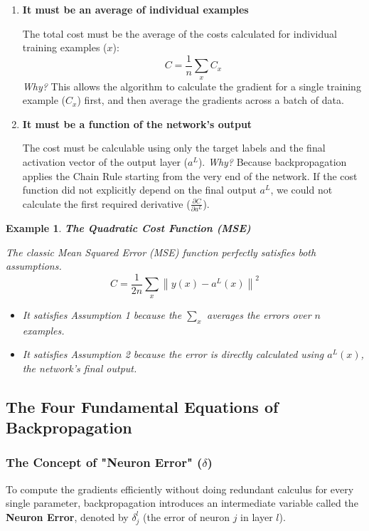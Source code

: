 \documentclass[11pt]{article}
\theoremstyle{smallexample}
\newtheorem{example}{Example}[section]
\newcommand{\vs}{\vspace{0.2\baselineskip}}
\begin{document}
\begin{enumerate}
\item \textbf{It must be an average of individual examples}


The total cost must be the average of the costs calculated for individual training examples ($x$):
\begin{equation*}
    C = \frac{1}{n} \sum_x C_x
\end{equation*}
\textit{Why?} This allows the algorithm to calculate the gradient for a single training example ($C_x$) first, and then average the gradients across a batch of data.

\vspace{0.25cm}
\item \textbf{ It must be a function of the network's output}

The cost must be calculable using only the target labels and the final activation vector of the output layer ($a^L$).
\textit{Why?} Because backpropagation applies the Chain Rule starting from the very end of the network. If the cost function did not explicitly depend on the final output $a^L$, we could not calculate the first required derivative ($\frac{\partial C}{\partial a^L}$).
\end{enumerate}

\vs
\begin{example}{\textbf{The Quadratic Cost Function (MSE)}}

The classic Mean Squared Error (MSE) function perfectly satisfies both assumptions. 
\begin{equation}
    C = \frac{1}{2n}\sum_x \left\| y(x) - a^L(x) \right\|^2
\end{equation}
\begin{itemize}
    \item It satisfies Assumption 1 because the $\sum_x$ averages the errors over $n$ examples.
    \item It satisfies Assumption 2 because the error is directly calculated using $a^L(x)$, the network's final output.
\end{itemize}
\end{example}

\subsection{The Four Fundamental Equations of Backpropagation}

\subsubsection{The Concept of "Neuron Error" ($\delta$)}
To compute the gradients efficiently without doing redundant calculus for every single parameter, backpropagation introduces an intermediate variable called the \textbf{Neuron Error}, denoted by $\delta_j^l$ (the error of neuron $j$ in layer $l$).
\end{document}
